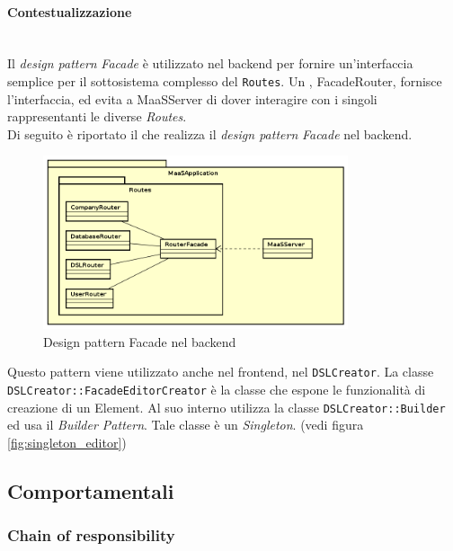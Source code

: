 \paragraph{Contestualizzazione}\mbox{} \\
Il \textit{design pattern} \textit{Facade} è utilizzato nel backend per fornire un'interfaccia semplice per il sottosistema complesso del  \texttt{Routes}. Un , FacadeRouter, fornisce l'interfaccia, ed evita a MaaSServer di dover interagire con i singoli  rappresentanti le diverse \textit{Routes}. \\
Di seguito è riportato il  che realizza il \textit{design pattern} \textit{Facade} nel backend.
\begin{figure}[H]
\centering
\includegraphics[width=0.8\textwidth]{res/sections/backend/facadeRoutes.png}
\caption{Design pattern Facade nel backend}
\end{figure}
Questo pattern viene utilizzato anche nel frontend, nel  \texttt{DSLCreator}. La classe \texttt{DSLCreator::FacadeEditorCreator} è la classe che espone le funzionalità di creazione di un  Element. Al suo interno utilizza la classe \texttt{DSLCreator::Builder} ed usa il \textit{Builder Pattern}. Tale classe è un \textit{Singleton}. (vedi figura \ref{fig:singleton_editor})
\subsection{Comportamentali}
\subsubsection{Chain of responsibility}
